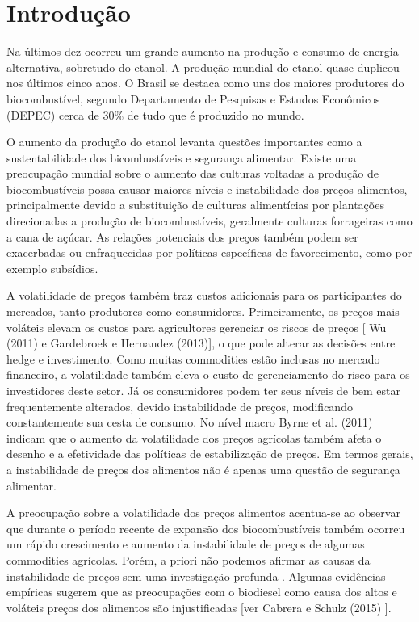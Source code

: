 \documentclass[a4paper,12pt] {article}
\begin{document}
	
	\section{Introdução}


Na últimos dez ocorreu um grande aumento na produção e consumo de energia alternativa, sobretudo do etanol. A produção mundial do etanol quase duplicou nos últimos cinco anos. O Brasil se destaca como uns dos maiores produtores do  biocombustível, segundo Departamento de Pesquisas e Estudos Econômicos (DEPEC) cerca de 30\%  de tudo que é produzido no mundo.

O aumento da produção do etanol levanta questões importantes como a sustentabilidade dos bicombustíveis e  segurança alimentar. Existe uma preocupação mundial sobre o aumento das culturas voltadas a produção de biocombustíveis possa causar  maiores níveis e  instabilidade dos preços alimentos, principalmente devido a substituição de culturas alimentícias por  plantações direcionadas a produção de biocombustíveis, geralmente culturas forrageiras como a cana de açúcar.   As relações potenciais dos preços também podem ser exacerbadas ou enfraquecidas por políticas específicas de favorecimento, como por exemplo subsídios.

A volatilidade de preços também traz custos adicionais para os participantes do mercados, tanto produtores como consumidores. Primeiramente, os preços mais  voláteis  elevam os custos para agricultores gerenciar os riscos de preços [ Wu (2011) e Gardebroek e Hernandez (2013)], o que pode alterar as decisões entre hedge e investimento. Como muitas commodities estão inclusas no mercado financeiro, a volatilidade  também eleva o custo de gerenciamento do risco para os investidores deste setor.  Já os consumidores podem ter seus níveis de bem estar frequentemente alterados, devido instabilidade de preços, modificando constantemente sua cesta de consumo. No nível macro Byrne et al. (2011) indicam que o aumento da volatilidade dos preços agrícolas também afeta o desenho e a efetividade das políticas de estabilização de preços. Em termos gerais, a instabilidade de preços dos alimentos não é apenas uma questão de segurança alimentar. 

 A preocupação sobre a volatilidade dos preços alimentos acentua-se ao observar que durante o período recente de  expansão dos biocombustíveis também ocorreu um rápido crescimento e aumento da instabilidade de preços  de algumas commodities agrícolas. Porém, a priori não podemos afirmar as causas da instabilidade de preços sem uma investigação profunda . Algumas evidências empíricas sugerem que as preocupações com o biodiesel como causa dos altos e voláteis  preços dos alimentos são injustificadas [ver  Cabrera e Schulz (2015) ].
 
\end{document}
